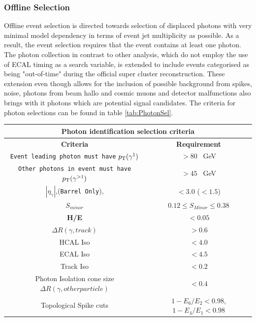 \subsubsection{Offline Selection}
Offline event selection is directed towards selection of displaced photons with very minimal model dependency in terms of event jet multiplicity as possible. As a result, the event selection requires that the event contains at least one photon. The photon collection in contrast to other analysis, which do not employ the use of ECAL timing as a search variable, is extended to include events categorised as being "out-of-time" during the official super cluster reconstruction. These extension even though allows for the inclusion of possible background from spikes, noise, photons from beam hallo and cosmic muons and detector malfunctions also brings with it photons which are potential signal candidates.
The criteria for photon selections can be found in table \ref{tab:PhotonSel}. 

\begin{center}
\centering
\begin{tabular}{c c }
\multicolumn{2}{c}{\bfseries{Photon identification selection criteria}} \\
  \hline 
  \bfseries{Criteria} & \bfseries{Requirement} \\
   \hline 
  \texttt{Event leading photon must have} $p_{\mathrm{T}}(\gamma^{1})$  & $ > 80$~ GeV \\
  \texttt{Other photons in event must have} $p_{\mathrm{T}}(\gamma^{>1})$  & $ > 45$~ GeV \\
  
 $|\eta_{\gamma}|$,(\texttt{Barrel Only}),  & $ < 3.0$ ($ < 1.5$) \\
 $S_{minor}$  & $ 0.12 \leq S_{Minor} \leq 0.38$ \\
 \textbf{H/E}  & $ < 0.05$ \\
 
 $\Delta R(\gamma, track)$  & $ > 0.6 $ \\
 
 HCAL Iso  & $ < 4.0 $ \\
 ECAL Iso   & $ < 4.5 $ \\
 Track Iso   & $ < 0.2 $ \\
 Photon Isolation cone size $\Delta R(\gamma, other particle)$ & $< 0.4$ \\
 Topological Spike cuts  & $1 - E_{6}/E_{2} < 0.98$, $ 1 - E_{4}/E_{1} < 0.98$ \\ 
  \hline 
\end{tabular}
\label{tab:PhotonSel}
\end{center}

